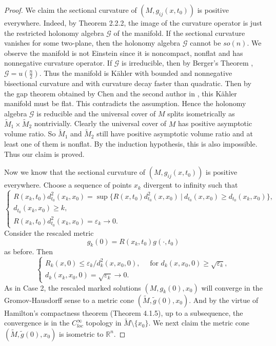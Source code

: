 \begin{proof}
We claim the sectional curvature of $(M,g_{ij}(x,t_0))$ is
positive everywhere. Indeed, by Theorem 2.2.2, the image of the
curvature operator is just the restricted holonomy algebra
$\mathcal{G}$ of the manifold. If the sectional curvature vanishes
for some two-plane, then the holonomy algebra $\mathcal{G}$ cannot
be $so(n)$. We observe the manifold is not Einstein since it is
noncompact, nonflat and has nonnegative curvature operator. If
$\mathcal{G}$ is irreducible, then by Berger's Theorem \cite{Ber},
$\mathcal{G} = u(\frac{n}{2})$. Thus the manifold is  K\"ahler
with bounded and nonnegative bisectional curvature and with
curvature decay faster than quadratic. Then by the gap theorem
obtained by Chen and the second author in \cite{CZ03}, this
K\"ahler manifold must be flat. This contradicts the assumption.
Hence the holonomy algebra $\mathcal{G}$ is reducible and the
universal cover of $M$ splits isometrically as $\tilde{M}_1 \times
\tilde{M}_2$ nontrivially. Clearly the universal cover of $M$ has
positive asymptotic volume ratio. So $\tilde{M}_1$ and
$\tilde{M}_2$ still have positive asymptotic volume ratio and at
least one of them is nonflat. By the induction hypothesis, this is
also impossible. Thus our claim is proved.

Now we know that the sectional curvature of $(M,g_{ij}(x,t_0))$ is
positive everywhere. Choose a sequence of points $x_k$ divergent
to infinity such that
$$
   \left\{
   \begin{array}{lll}
    R(x_k,t_0)d^2_{t_0}(x_k,x_0) = \sup \{ R(x,t_0)d^2_{t_0}(x,x_0)\
    |\
    d_{t_0}(x,x_0)\geq d_{t_0}(x_k,x_0)\},
         \\[2mm]
    d_{t_0}(x_k,x_0) \geq k,
         \\[2mm]
    R(x_k,t_0)d^2_{t_0}(x_k,x_0)=\varepsilon_k \rightarrow 0.
\end{array}
\right.
$$
Consider the rescaled metric
$$
g_k(0) = R(x_k,t_0)g(\cdot,t_0)
$$
as before. Then \begin{equation}
   \left\{
   \begin{array}{lll}
    R_k(x,0) \leq {\varepsilon_k}/{d^2_k(x,x_0,0)},\quad \mbox{ for }
    d_k(x,x_0,0) \geq \sqrt{\varepsilon_k},
         \\[2mm]
    d_{k}(x_k,x_0,0) = \sqrt{\varepsilon_k} \rightarrow 0.
\end{array}
\right. %
\end{equation} As in Case 2, the rescaled marked solutions $(M,g_k(0),x_0)$
will converge in the Gromov-Hausdorff sense to a metric cone
$(\tilde{M},\tilde{g}(0),x_0)$. And by the virtue of Hamilton's
compactness theorem (Theorem 4.1.5), up to a subsequence, the
convergence is in the $C^{\infty}_{loc}$ topology in
$\tilde{M}\setminus \{x_0\}$. We next claim the metric cone
$(\tilde{M},\tilde{g}(0),x_0)$ is isometric to $\mathbb{R}^n$.


\end{proof}

